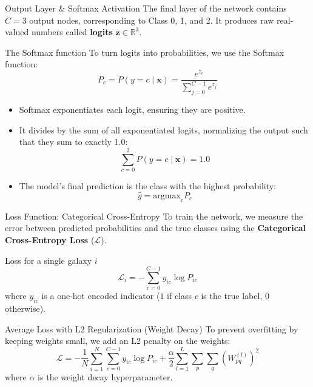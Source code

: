 \documentclass[9pt]{beamer}
\begin{document}
\begin{frame}{Output Layer \& Softmax Activation}
  The final layer of the network contains $C=3$ output nodes, corresponding to Class 0, 1, and 2. It produces raw real-valued numbers called \textbf{logits} $\mathbf{z} \in \mathbb{R}^3$.
  \begin{block}{The Softmax function}
    To turn logits into probabilities, we use the Softmax function:
    $$P_c = P(y = c \mid \mathbf{x}) = \frac{e^{z_c}}{\sum_{j=0}^{C-1} e^{z_j}}$$
  \end{block}
  \begin{itemize}
    \item Softmax exponentiates each logit, ensuring they are positive.
    \item It divides by the sum of all exponentiated logits, normalizing the output such that they sum to exactly 1.0:
      $$\sum_{c=0}^2 P(y = c \mid \mathbf{x}) = 1.0$$
    \item The model's final prediction is the class with the highest probability:
      $$\hat{y} = \text{argmax}_{c} P_c$$
  \end{itemize}
\end{frame}

\begin{frame}{Loss Function: Categorical Cross-Entropy}
  To train the network, we measure the error between predicted probabilities and the true classes using the \textbf{Categorical Cross-Entropy Loss} ($\mathcal{L}$).
  \begin{block}{Loss for a single galaxy $i$}
    $$\mathcal{L}_i = - \sum_{c=0}^{C-1} y_{ic} \log P_{ic}$$
    where $y_{ic}$ is a one-hot encoded indicator ($1$ if class $c$ is the true label, $0$ otherwise).
  \end{block}
  \begin{block}{Average Loss with L2 Regularization (Weight Decay)}
    To prevent overfitting by keeping weights small, we add an L2 penalty on the weights:
    $$\mathcal{L} = -\frac{1}{N} \sum_{i=1}^N \sum_{c=0}^{C-1} y_{ic} \log P_{ic} + \frac{\alpha}{2} \sum_{l=1}^L \sum_{p} \sum_{q} (W_{pq}^{(l)})^2$$
    where $\alpha$ is the weight decay hyperparameter.
  \end{block}
\end{frame}
\end{document}
